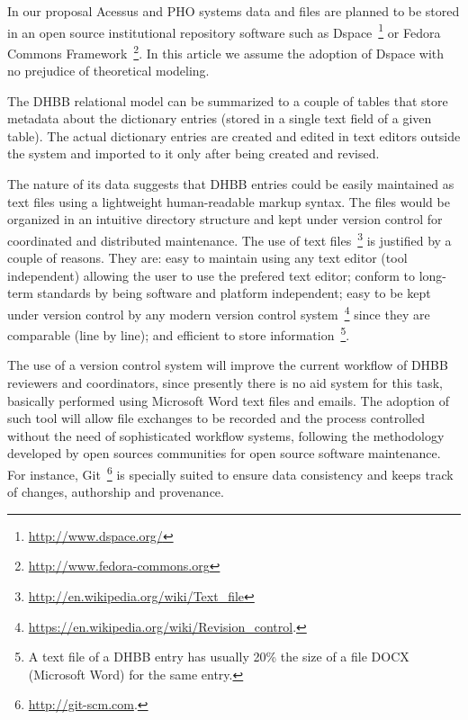 In our proposal Acessus and PHO systems data and files are planned to
be stored in an open source institutional repository software such as
Dspace~\footnote{\url{http://www.dspace.org/}} or Fedora Commons
Framework~\footnote{\url{http://www.fedora-commons.org}}.
In this article we assume the adoption of Dspace with no prejudice of
theoretical modeling.


The DHBB relational model can be summarized to a couple of tables that
store metadata about the dictionary entries (stored in a single text
field of a given table). The actual dictionary entries are created and
edited in text editors outside the system and imported to it only
after being created and revised.


The nature of its data suggests that DHBB entries could be easily
maintained as text files using a lightweight human-readable markup
syntax. The files would be organized in an intuitive directory
structure and kept under version control for coordinated and
distributed maintenance. The use of text
files~\footnote{\url{http://en.wikipedia.org/wiki/Text_file}} is
justified by a couple of reasons. They are: easy to maintain using any
text editor (tool independent) allowing the user to use the prefered
text editor; conform to long-term standards by being software and
platform independent; easy to be kept under version control by any
modern version control
system~\footnote{\url{https://en.wikipedia.org/wiki/Revision_control}.}
since they are comparable (line by line); and efficient to store
information~\footnote{A text file of a DHBB entry has usually 20\% the
  size of a file DOCX (Microsoft Word) for the same entry.}.

The use of a version control system will improve the current workflow
of DHBB reviewers and coordinators, since presently there is no aid
system for this task, basically performed using Microsoft Word text
files and emails. The adoption of such tool will allow file exchanges
to be recorded and the process controlled without the need of
sophisticated workflow systems, following the methodology developed by
open sources communities for open source software maintenance. For
instance, Git~\footnote{\url{http://git-scm.com}.} is specially suited
to ensure data consistency and keeps track of changes, authorship and
provenance.

